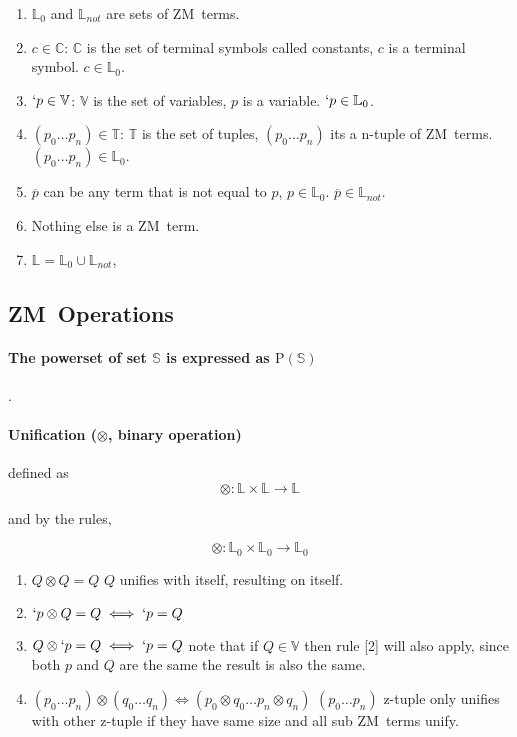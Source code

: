 \documentclass[11pt,a4paper]{report}
\newcommand{\zm}{ZM}
\newcommand{\var}[1]{`#1}
\newcommand{\unify}{\otimes}
\begin{document}
\begin{enumerate}
\item $\mathbb{L}_{0}$ and $\mathbb{L}_{not}$ are sets of \zm\ terms.
\item $c \in \mathbb{C}$: $\mathbb{C}$ is the set of terminal symbols called constants, $c$ is a terminal symbol. $c \in \mathbb{L}_{0}$.
\item $\var{p} \in \mathbb{V}$: $\mathbb{V}$ is the set of variables, $p$ is a variable. $\var{p} \in \mathbb{L}_{0}$.
\item $(p_{0} \ldots p_{n}) \in \mathbb{T}$: $\mathbb{T}$ is the set of tuples, $(p_{0} \ldots p_{n})$ its a n-tuple of \zm\ terms. $(p_{0} \ldots p_{n}) \in \mathbb{L}_{0}$.
\item $\overline{p}$ can be any term that is not equal to $p$, $p \in \mathbb{L}_{0}$. $\overline{p} \in \mathbb{L}_{not}$.
\item Nothing else is a \zm\ term.
\item $\mathbb{L} = \mathbb{L}_{0} \cup \mathbb{L}_{not}$,
\end{enumerate}


\subsection{\zm\ Operations}

\paragraph{The powerset of set $\mathbb{S}$ is expressed as $\mathrm{P}(\mathbb{S})$}.

\paragraph{Unification ($\unify$, binary operation)} defined as
\[
    \unify: \mathbb{L} \times \mathbb{L} \rightarrow \mathbb{L}
\]

and by the rules,

\[
    \unify: \mathbb{L}_{0} \times \mathbb{L}_{0} \rightarrow \mathbb{L}_{0}
\]

\begin{enumerate}
\item $Q \unify Q = Q$
    \subitem $Q$ unifies with itself, resulting on itself.

\item $\var{p} \unify Q = Q \iff \var{p} = Q$
\item $Q \unify \var{p} = Q \iff \var{p} = Q$
    \subitem note that if $Q \in \mathbb{V}$ then rule [2] will also apply, since both $p$ and $Q$ are the same the result is also the same.

\item $(p_{0} \ldots p_{n}) \unify (q_{0} \ldots q_{n}) \iff (p_{0} \unify q_{0} \ldots p_{n} \unify q_{n})$
    \subitem $(p_{0} \ldots p_{n})$ z-tuple only unifies with other z-tuple if they have same size and all sub \zm\ terms unify.

\end{enumerate}
\end{document}
